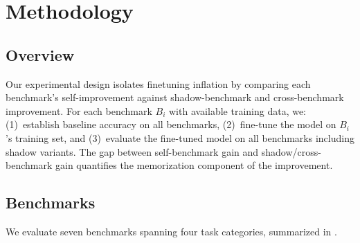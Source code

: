 \section{Methodology}
\label{sec:method}

\subsection{Overview}

Our experimental design isolates finetuning inflation by comparing each benchmark's self-improvement against shadow-benchmark and cross-benchmark improvement. For each benchmark $B_i$ with available training data, we: (1)~establish baseline accuracy on all benchmarks, (2)~fine-tune the model on $B_i$'s training set, and (3)~evaluate the fine-tuned model on all benchmarks including shadow variants. The gap between self-benchmark gain and shadow/cross-benchmark gain quantifies the memorization component of the improvement.

\subsection{Benchmarks}
\label{sec:benchmarks}

We evaluate seven benchmarks spanning four task categories, summarized in .

\begin{table}[t]
\centering
\caption{Benchmarks used in our study. ``Shadow'' indicates a variant benchmark used to measure finetuning inflation. Evaluation sizes reflect random subsets (seed=42) used for computational efficiency, except \gpqa which uses its full set.}
\label{tab:datasets}
\vspace{4pt}
\end{table}

